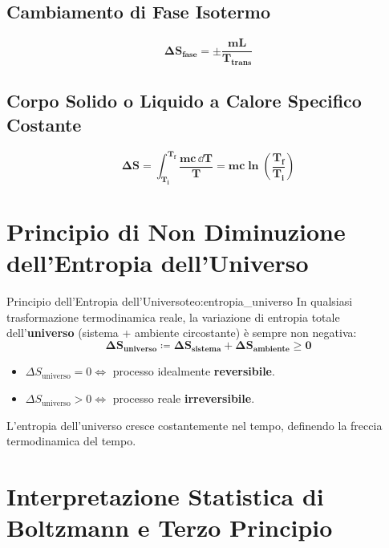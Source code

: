 \subsection{Cambiamento di Fase Isotermo}
\begin{equation}
    \mathbf{\Delta S_{\text{fase}} = \pm \frac{m L}{T_{\text{trans}}}}
\end{equation}

\subsection{Corpo Solido o Liquido a Calore Specifico Costante}
\begin{equation}
    \mathbf{\Delta S = \int_{T_i}^{T_f} \frac{m c\,\dd T}{T} = m c \ln\left(\frac{T_f}{T_i}\right)}
\end{equation}

\section{Principio di Non Diminuzione dell'Entropia dell'Universo}
\label{sec:entropia_universo}

\begin{teorema}{Principio dell'Entropia dell'Universo}{teo:entropia_universo}
In qualsiasi trasformazione termodinamica reale, la variazione di entropia totale dell'\textbf{universo} (sistema + ambiente circostante) è sempre non negativa:
\begin{equation}
    \mathbf{\Delta S_{\text{universo}} \coloneqq \Delta S_{\text{sistema}} + \Delta S_{\text{ambiente}} \ge 0}
    \label{eq:ds_universo}
\end{equation}
\begin{itemize}
    \item $\Delta S_{\text{universo}} = 0 \iff$ processo idealmente \textbf{reversibile}.
    \item $\Delta S_{\text{universo}} > 0 \iff$ processo reale \textbf{irreversibile}.
\end{itemize}
L'entropia dell'universo cresce costantemente nel tempo, definendo la freccia termodinamica del tempo.
\end{teorema}

\section{Interpretazione Statistica di Boltzmann e Terzo Principio}
\label{sec:boltzmann_terzo_principio}

